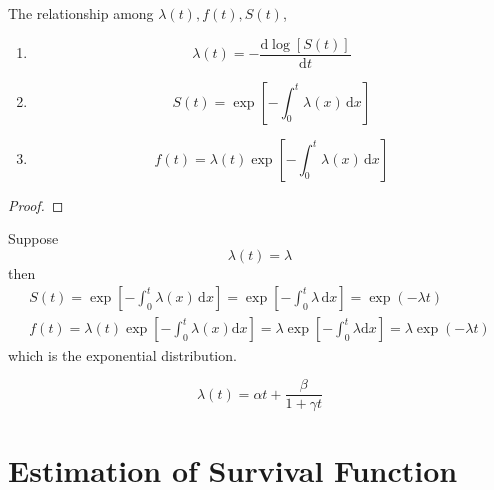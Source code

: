 \begin{property}
    The relationship among $\lambda(t),f(t),S(t)$,
    \begin{enumerate}
        \item
              \begin{equation}
                  \lambda(t)=-\frac{\mathrm{d}\log [S(t)]}{\mathrm{d}t}
              \end{equation}
        \item
              \begin{equation}
                  S(t)=\exp\left[-\int_{0}^{t}\lambda(x)\,\mathrm{d}x\right]
              \end{equation}
        \item
              \begin{equation}
                  f(t)=\lambda(t)\exp\left[-\int_{0}^{t}\lambda(x)\,\mathrm{d}x\right]
              \end{equation}
    \end{enumerate}
\end{property}

\begin{proof}

\end{proof}

\begin{example}
    Suppose
    \begin{equation}
        \lambda(t)=\lambda
    \end{equation}
    then
    \begin{gather*}
        S(t)=\exp\left[-\int_{0}^{t}\lambda(x)\,\mathrm{d}x\right]=\exp\left[-\int_{0}^{t}\lambda\,\mathrm{d}x\right]=\exp(-\lambda t) \\
        f(t)=\lambda(t)\exp\left[-\int_{0}^{t}\lambda(x)\mathrm{d}x\right]=\lambda\exp\left[-\int_{0}^{t}\lambda\mathrm{d}x\right]=\lambda\exp(-\lambda t)
    \end{gather*}
    which is the exponential distribution.
\end{example}

\begin{example}
    \begin{equation}
        \lambda(t)=\alpha t+\frac{\beta}{1+\gamma t}
    \end{equation}
\end{example}

\section{Estimation of Survival Function}

